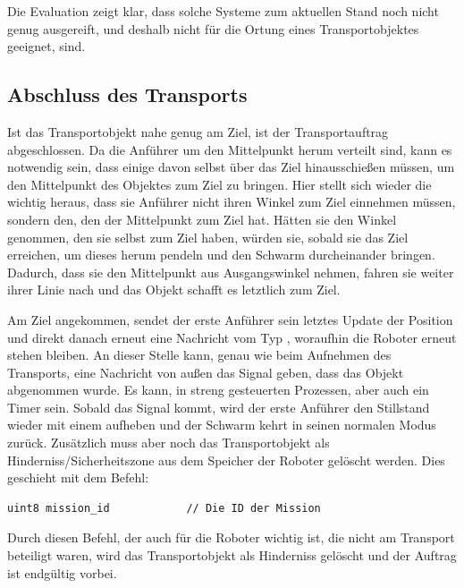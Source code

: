 Die Evaluation zeigt klar, dass solche Systeme zum aktuellen Stand noch nicht genug ausgereift, und deshalb nicht für die Ortung eines Transportobjektes geeignet, sind.

\subsection*{Abschluss des Transports}

Ist das Transportobjekt nahe genug am Ziel, ist der Transportauftrag abgeschlossen. Da die Anführer um den Mittelpunkt herum verteilt sind, kann es notwendig sein, dass einige davon selbst über das Ziel hinausschießen müssen, um den Mittelpunkt des Objektes zum Ziel zu bringen. Hier stellt sich wieder die wichtig heraus, dass sie Anführer nicht ihren Winkel zum Ziel einnehmen müssen, sondern den, den der Mittelpunkt zum Ziel hat. Hätten sie den Winkel genommen, den sie selbst zum Ziel haben, würden sie, sobald sie das Ziel erreichen, um dieses herum pendeln und den Schwarm durcheinander bringen. Dadurch, dass sie den Mittelpunkt aus Ausgangswinkel nehmen, fahren sie weiter ihrer Linie nach und das Objekt schafft es letztlich zum Ziel.

Am Ziel angekommen, sendet der erste Anführer sein letztes Update der Position und direkt danach erneut eine Nachricht vom Typ , woraufhin die Roboter erneut stehen bleiben. An dieser Stelle kann, genau wie beim Aufnehmen des Transports, eine Nachricht von außen das Signal geben, dass das Objekt abgenommen wurde. Es kann, in streng gesteuerten Prozessen, aber auch ein Timer sein. Sobald das Signal kommt, wird der erste Anführer den Stillstand wieder mit einem  aufheben und der Schwarm kehrt in seinen normalen Modus zurück. Zusätzlich muss aber noch das Transportobjekt als Hinderniss/Sicherheitszone aus dem Speicher der Roboter gelöscht werden. Dies geschieht mit dem Befehl:

\begin{lstlisting}[style=ros, title=Nachrichten-Typ: Delete\_Object.msg]
uint8 mission_id			// Die ID der Mission
\end{lstlisting}

Durch diesen Befehl, der auch für die Roboter wichtig ist, die nicht am Transport beteiligt waren, wird das Transportobjekt als Hinderniss gelöscht und der Auftrag ist endgültig vorbei.












